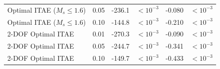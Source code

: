 \begin{table}[t]
{\begin{tabular}{lccccc}
Optimal ITAE ($M_s \leq 1.6$) & 0.05 & -236.1 & $<10^{-3}$ & -0.080 & $<10^{-3}$ \\
Optimal ITAE ($M_s \leq 1.6$) & 0.10 & -144.8 & $<10^{-3}$ & -0.210 & $<10^{-3}$ \\
2-DOF Optimal ITAE & 0.01 & -270.3 & $<10^{-3}$ & -0.090 & $<10^{-3}$ \\
2-DOF Optimal ITAE & 0.05 & -244.7 & $<10^{-3}$ & -0.341 & $<10^{-3}$ \\
2-DOF Optimal ITAE & 0.10 & -149.7 & $<10^{-3}$ & -0.433 & $<10^{-3}$ \\
\bottomrule
\end{tabular}%
}
\end{table}
